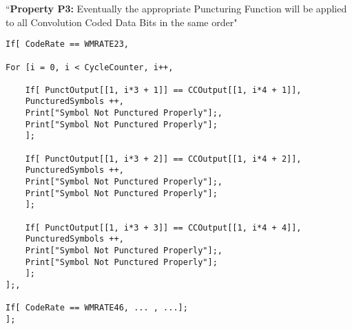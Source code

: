 \documentclass[submission,copyright,creativecommons]{eptcs}
\begin{document}
\vspace{3 mm}

\noindent ``\textbf{Property P3:} Eventually the appropriate Puncturing Function will be applied to all Convolution Coded Data Bits in the same order"

\vspace{3 mm}

\lstset{basicstyle=\ttfamily, numbers=left, numberstyle=\ttfamily, frame=single, breaklines=true}
\begin{lstlisting}
If[ CodeRate == WMRATE23,

For [i = 0, i < CycleCounter, i++,
	
	If[ PunctOutput[[1, i*3 + 1]] == CCOutput[[1, i*4 + 1]],
	PuncturedSymbols ++,
	Print["Symbol Not Punctured Properly"];,		
	Print["Symbol Not Punctured Properly"];
	];

	If[ PunctOutput[[1, i*3 + 2]] == CCOutput[[1, i*4 + 2]],
	PuncturedSymbols ++,
	Print["Symbol Not Punctured Properly"];,
	Print["Symbol Not Punctured Properly"];
	];

	If[ PunctOutput[[1, i*3 + 3]] == CCOutput[[1, i*4 + 4]],
	PuncturedSymbols ++,
	Print["Symbol Not Punctured Properly"];,
	Print["Symbol Not Punctured Properly"];
	];
];,

If[ CodeRate == WMRATE46, ... , ...];
];
\end{lstlisting}
\end{document}
